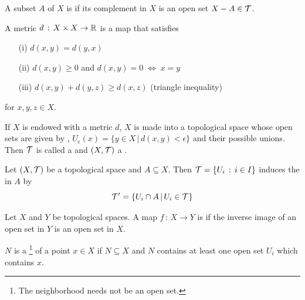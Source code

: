 \documentclass[a4paper, 10pt]{article}
\begin{document}
\begin{remark}
    A subset $A$ of $X$ is  if its complement in $X$ is an open set $X - A \in \mathcal{T}$.
\end{remark}

\seprule

\begin{definition}[Metric]
    A metric $d \,:\, X \times X \rightarrow \mathbb{R}$ is a map that satisfies
    \begin{itemize}
        \item[(i)] $d(x,y) = d(y,x)$
        \item[(ii)] $d(x,y) \geq 0$ and $d(x,y) = 0 \;\Longleftrightarrow\; x = y$
        \item[(iii)] $d(x,y) + d(y,z) \geq d(x,z)$ (triangle inequality)
    \end{itemize}
    for $x, y, z \in X$.
\end{definition}
\newpage


\begin{definition}
    If $X$ is endowed with a metric $d$, $X$ is made into a topological space whose open sets are given by , $U_{\epsilon}(x) = \{ y \in X \,|\, d(x,y)<\epsilon \}$ and their possible unions. Then $\mathcal{T}$ is called a  and $(X, \mathcal{T})$ a .
\end{definition}

\begin{definition}
    Let $(X, \mathcal{T})$ be a topological space and $A \subseteq X$. Then $\mathcal{T} = \{U_{i} \,:\, i \in I \}$ induces the  in $A$ by
    \[ \mathcal{T}' = \{ U_{i} \cap A \,|\, U_{i} \in \mathcal{T} \} \]
\end{definition}

\begin{definition}
    Let $X$ and $Y$ be topological spaces. A map $f \,:\, X \rightarrow Y$ is  if the inverse image of an open set in $Y$ is an open set in $X$.
\end{definition}

\begin{definition}[Neighborhood]
    $N$ is a \footnote{The neighborhood needs not be an open set.} of a point $x \in X$ if $N \subseteq X$ and $N$ contains at least one open set $U_{i}$ which contains $x$.
\end{definition}
\end{document}
